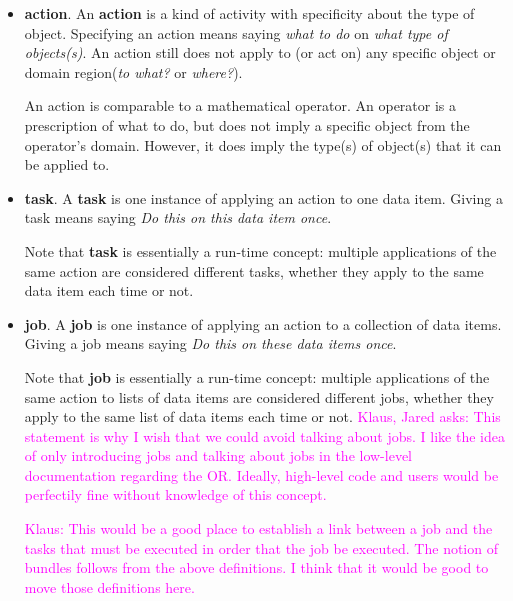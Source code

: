 \documentclass{article}
\newcommand{\Klaus}[1]          {\textcolor{magenta}{Klaus: #1}}
\newcommand{\KlausQfromJO}[1]   {\textcolor{magenta}{Klaus, Jared asks: #1}}
\newcommand{\domregion}              {domain region\xspace}    %
\newcommand{\domregions}             {domain regions\xspace}
\begin{document}
\begin{itemize}
Most activities, however, \textbf{do} need to be applied to specific
objects or \domregions, in order to yield a meaningful task.


\item \textbf{action}.
An \textbf{action} is a kind of activity with specificity about the type of object.
Specifying an action
means saying \textit{what to do} on \textit{what type of objects(s)}.
An action still does not
apply to (or act on) any specific object or \domregion (\textit{to what?} or \textit{where?}).

An action is comparable to a mathematical operator. An operator
is a prescription of what to do, but does not imply a
specific object from the operator's domain. However, it does
imply the type(s) of object(s) that it can be applied to.

\item \textbf{task}.
A \textbf{task} is one instance of applying an action to one data item.
Giving a task
means saying \textit{Do this on this data item once}.

Note that \textbf{task} is essentially a run-time concept:
multiple applications of the same action are considered
different tasks, whether they apply to the same data item each time or
not.

\item \textbf{job}.
A \textbf{job} is one instance of applying an action to a collection of data items.
Giving a job
means saying \textit{Do this on these data items once}.

Note that \textbf{job} is essentially a run-time concept:
multiple applications of the same action to lists of data items are considered
different jobs, whether they apply to the same list of data items each time or
not.  \KlausQfromJO{This statement is why I wish that we could avoid talking
about jobs.  I like the idea of only introducing jobs and talking about jobs in
the low-level documentation regarding the OR.  Ideally, high-level code and
users would be perfectily fine without knowledge of this concept.}

\Klaus{This would be a good place to establish a link between a job and the
tasks that must be executed in order that the job be executed.  The notion of
bundles follows from the above definitions.  I think that it would be good to
move those definitions here.}


\end{itemize}
\end{document}
